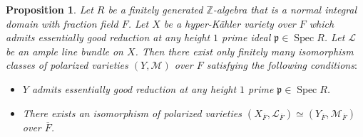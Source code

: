 \documentclass[11pt,reqno,oneside]{amsart}
\numberwithin{equation}{section}
\newtheorem{proposition}[theorem]{Proposition}
\theoremstyle{definition}
\DeclareMathOperator{\Spec}{Spec}
\newcommand{\ZZ}{\mathbb{Z}}
\newcommand{\p}{\mathfrak{p}}
\begin{document}
\begin{proposition}
\label{Proposition:FinitenessTwists2}
Let $R$ be a finitely generated $\ZZ$-algebra that is a normal integral domain with fraction field $F$.
Let $X$ be a hyper-Kähler variety over $F$ which admits essentially good reduction at any height $1$ prime ideal $\p \in \Spec R$.
Let $\mathscr{L}$ be an ample line bundle on $X$.
Then there exist only finitely many isomorphism classes of
polarized varieties $(Y,\mathscr{M})$ over $F$
satisfying the following conditions$\colon$
\begin{itemize}
\item 
$Y$ admits essentially good reduction at any height $1$ prime $\p \in \Spec R$.
\item There exists an isomorphism of polarized varieties
$(X_{\overline{F}},\mathscr{L}_{\overline{F}}) \simeq (Y_{\overline{F}},\mathscr{M}_{\overline{F}})$
over $\overline{F}$.
\end{itemize}
\end{proposition}
\end{document}
